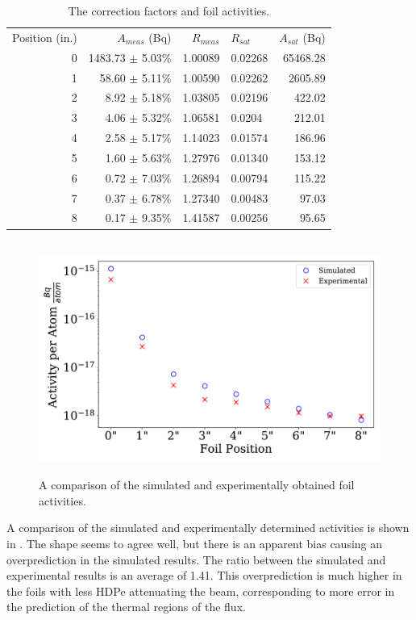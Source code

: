 \begin{table}[h]\centering
\label{tab:a_sat}
\caption{The correction factors and foil activities.}
\begin{tabular}{ r | r | r | l | r }
\toprule
Position (in.)  & $A_{meas}$ (Bq) & $R_{meas}$  & $R_{sat}$   &   $A_{sat}$  (Bq)\\
0 & 1483.73 $\pm$ 5.03\% & 1.00089 & 0.02268 & 65468.28 \\
1 & 58.60 $\pm$ 5.11\% & 1.00590 & 0.02262 &  2605.89  \\
2 & 8.92 $\pm$ 5.18\% & 1.03805 & 0.02196 &   422.02  \\
3 & 4.06 $\pm$ 5.32\% & 1.06581 & 0.0204  &   212.01  \\
4 & 2.58 $\pm$ 5.17\% & 1.14023 & 0.01574  &   186.96  \\
5 & 1.60 $\pm$ 5.63\% & 1.27976 & 0.01340 &      153.12  \\
6 & 0.72 $\pm$ 7.03\% & 1.26894 & 0.00794 &       115.22  \\
7 & 0.37 $\pm$ 6.78\% & 1.27340 & 0.00483 &      97.03   \\
8 & 0.17 $\pm$ 9.35\% & 1.41587 & 0.00256 &       95.65\\
\end{tabular}
\end{table}

\begin{figure}[htb]
\centering
\includegraphics[height=3in]{tex/figures/compare_activities.pdf}
\caption[Foil Activities]{A comparison of the simulated and experimentally obtained foil activities.}
\label{fig:compare_activities}
\end{figure}

A comparison of the simulated and experimentally determined activities is shown in .
The shape seems to agree well, but there is an apparent bias causing an overprediction in the simulated results.
The ratio between the simulated and experimental results is an average of 1.41.
This overprediction is much higher in the foils with less HDPe attenuating the beam, corresponding to more error in the prediction of the thermal regions of the flux.


